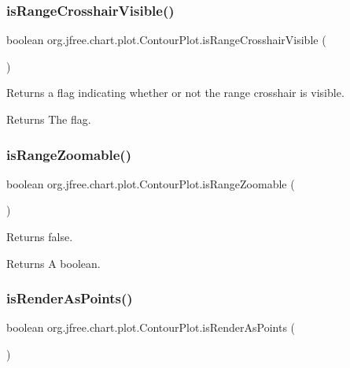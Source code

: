 \subsubsection{\texorpdfstring{is\+Range\+Crosshair\+Visible()}{isRangeCrosshairVisible()}}
{\footnotesize\ttfamily boolean org.\+jfree.\+chart.\+plot.\+Contour\+Plot.\+is\+Range\+Crosshair\+Visible (\begin{DoxyParamCaption}{ }\end{DoxyParamCaption})}

Returns a flag indicating whether or not the range crosshair is visible.

\begin{DoxyReturn}{Returns}
The flag. 
\end{DoxyReturn}
\mbox{\label{classorg_1_1jfree_1_1chart_1_1plot_1_1_contour_plot_aafa44a852a5c57661e64f833b7f2e9cf}} 
\subsubsection{\texorpdfstring{is\+Range\+Zoomable()}{isRangeZoomable()}}
{\footnotesize\ttfamily boolean org.\+jfree.\+chart.\+plot.\+Contour\+Plot.\+is\+Range\+Zoomable (\begin{DoxyParamCaption}{ }\end{DoxyParamCaption})}

Returns {\ttfamily false}.

\begin{DoxyReturn}{Returns}
A boolean. 
\end{DoxyReturn}
\mbox{\label{classorg_1_1jfree_1_1chart_1_1plot_1_1_contour_plot_a3e14f26fc315d69e403fee5981707bde}} 
\subsubsection{\texorpdfstring{is\+Render\+As\+Points()}{isRenderAsPoints()}}
{\footnotesize\ttfamily boolean org.\+jfree.\+chart.\+plot.\+Contour\+Plot.\+is\+Render\+As\+Points (\begin{DoxyParamCaption}{ }\end{DoxyParamCaption})}

